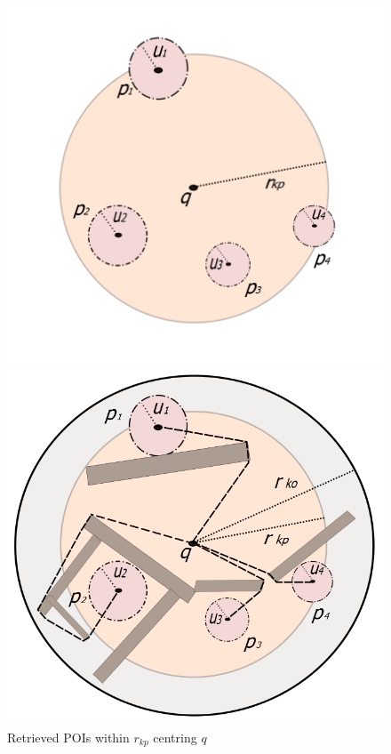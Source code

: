 \documentclass{sig-alternate}
\begin{document}
\begin{figure}[!htb]
  \includegraphics[width=\linewidth]{poi.png}
  \caption{Retrieved POIs within $r_{kp}$ centring $q$}\label{fig:poi}
\endminipage\hfill
{}
  \includegraphics[width=\linewidth]{poi_obs_path.png}

\end{figure}
\end{document}
